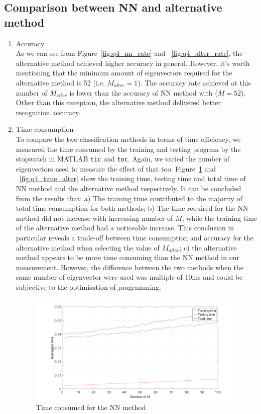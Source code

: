 \documentclass[10pt,twocolumn,letterpaper]{article}
\begin{document}
\subsection{Comparison between NN and alternative method}
\begin{enumerate}
	\item Accuracy\\
	As we can see from Figure~\ref{fig:q4_nn_rate} and ~\ref{fig:q4_alter_rate}, the alternative method achieved higher accuracy in general. However, it's worth mentioning that the minimum amount of eigenvectors required for the alternative method is 52 (i.e. $M_{alter} = 1$). The accuracy rate achieved at this number of $M_{alter}$ is lower than the accuracy of NN method with ($M = 52$). Other than this exception, the alternative method delivered better recognition accuracy.\\
	
	\item Time consumption\\
	To compare the two classification methods in terms of time efficiency, we measured the time consumed by the training and testing program by the stopwatch in MATLAB \texttt{tic} and \texttt{toc}. Again, we varied the number of eigenvectors used to measure the effect of that too. Figure~\ref{fig:q4_time_nn} and ~\ref{fig:q4_time_alter} show the training time, testing time and total time of NN method and the alternative method respectively. It can be concluded from the results that: a) The training time contributed to the majority of total time consumption for both methods; b) The time required for the NN method did not increase with increasing number of $M$, while the training time of the alternative method had a noticeable increase. This conclusion in particular reveals a trade-off between time consumption and accuracy for the alternative method when selecting the value of $M_{alter}$; c) the alternative method appears to be more time consuming than the NN method in our measurement. However, the difference between the two methods when the same number of eigenvector were used was multiple of 10ms and could be subjective to the optimisation of programming.
	
	\begin{figure}
		\begin{center}
			\includegraphics[width=0.9\linewidth]{time_NN}
			\caption{Time consumed for the NN method}
			\label{fig:q4_time_nn}
		\end{center}
	\end{figure}
	

\end{enumerate}
\end{document}
